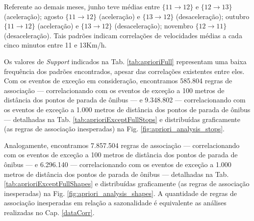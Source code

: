 \documentclass[
	12pt,				%
	oneside,			%
	a4paper,			%
	english,			%
	brazil				%
	]{abntex2ppgsi}
\begin{document}
{{Referente ao demais meses, junho teve médias entre $\lbrace11 \rightarrow 12\rbrace$ e $\lbrace12 \rightarrow 13\rbrace$ (aceleração); agosto $\lbrace11 \rightarrow 12\rbrace$ (aceleração) e $\lbrace13 \rightarrow 12\rbrace$  (desaceleração); outubro $\lbrace11 \rightarrow 12\rbrace$ (aceleração) e $\lbrace13 \rightarrow 12\rbrace$ (desaceleração); novembro $\lbrace12 \rightarrow 11\rbrace$ (desaceleração). Tais padrões indicam correlações de velocidades médias a cada cinco minutos entre 11 e 13Km/h.

Os valores de \textit{Support} indicados na Tab. \ref{tab:aprioriFull} representam uma baixa frequência dos padrões encontrados, apesar das correlações existentes entre eles. Com os eventos de exceção em consideração, encontramos 585.804 regras de associação --- correlacionando com os eventos de exceção a 100 metros de distância dos pontos de parada de ônibus --- e 9.348.802 --- correlacionando com os eventos de exceção a 1.000 metros de distância dos pontos de parada de ônibus --- detalhadas na Tab. \ref{tab:aprioriExceptFullStops} e distribuídas graficamente (as regras de associação inesperadas) na Fig. \ref{fig:apriori_analysis_stops}. 

Analogamente, encontramos 7.857.504 regras de associação --- correlacionando com os eventos de exceção a 100 metros de distância dos pontos de parada de ônibus --- e 6.296.140 --- correlacionando com os eventos de exceção a 1.000 metros de distância dos pontos de parada de ônibus --- detalhadas na Tab. \ref{tab:aprioriExceptFullShapes} e distribuídas graficamente (as regras de associação inesperadas)  na Fig. \ref{fig:apriori_analysis_shapes}. A quantidade de regras de associação inesperadas em relação a sazonalidade é equivalente as análises realizadas no Cap. \ref{dataCorr}.

}}
\end{document}

